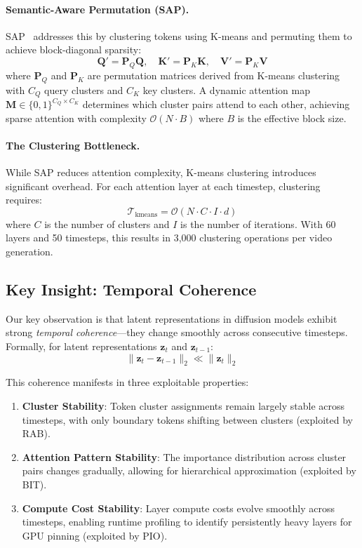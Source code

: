 \paragraph{Semantic-Aware Permutation (SAP).}
SAP~\cite{xi2025sparse,yang2025sparse} addresses this by clustering tokens using K-means and permuting them to achieve block-diagonal sparsity:
\begin{equation}
    \mathbf{Q}' = \mathbf{P}_Q \mathbf{Q}, \quad \mathbf{K}' = \mathbf{P}_K \mathbf{K}, \quad \mathbf{V}' = \mathbf{P}_K \mathbf{V}
\end{equation}
where $\mathbf{P}_Q$ and $\mathbf{P}_K$ are permutation matrices derived from K-means clustering with $C_Q$ query clusters and $C_K$ key clusters. A dynamic attention map $\mathbf{M} \in \{0,1\}^{C_Q \times C_K}$ determines which cluster pairs attend to each other, achieving sparse attention with complexity $\mathcal{O}(N \cdot B)$ where $B$ is the effective block size.

\paragraph{The Clustering Bottleneck.}
While SAP reduces attention complexity, K-means clustering introduces significant overhead. For each attention layer at each timestep, clustering requires:
\begin{equation}
    \mathcal{T}_{\text{kmeans}} = \mathcal{O}(N \cdot C \cdot I \cdot d)
\end{equation}
where $C$ is the number of clusters and $I$ is the number of iterations. With 60 layers and 50 timesteps, this results in 3,000 clustering operations per video generation.

\subsection{Key Insight: Temporal Coherence}
\label{sec:temporal_coherence}

Our key observation is that latent representations in diffusion models exhibit strong \textit{temporal coherence}—they change smoothly across consecutive timesteps. Formally, for latent representations $\mathbf{z}_t$ and $\mathbf{z}_{t-1}$:
\begin{equation}
    \|\mathbf{z}_t - \mathbf{z}_{t-1}\|_2 \ll \|\mathbf{z}_t\|_2
\end{equation}

This coherence manifests in three exploitable properties:
\begin{enumerate}
    \item \textbf{Cluster Stability}: Token cluster assignments remain largely stable across timesteps, with only boundary tokens shifting between clusters (exploited by RAB).
    \item \textbf{Attention Pattern Stability}: The importance distribution across cluster pairs changes gradually, allowing for hierarchical approximation (exploited by BIT).
    \item \textbf{Compute Cost Stability}: Layer compute costs evolve smoothly across timesteps, enabling runtime profiling to identify persistently heavy layers for GPU pinning (exploited by PIO).
\end{enumerate}

